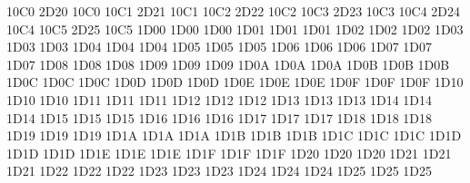 \setcclcuc 10C0 2D20 10C0 %
\setcclcuc 10C1 2D21 10C1 %
\setcclcuc 10C2 2D22 10C2 %
\setcclcuc 10C3 2D23 10C3 %
\setcclcuc 10C4 2D24 10C4 %
\setcclcuc 10C5 2D25 10C5 %
\setcclcuc 1D00 1D00 1D00 %
\setcclcuc 1D01 1D01 1D01 %
\setcclcuc 1D02 1D02 1D02 %
\setcclcuc 1D03 1D03 1D03 %
\setcclcuc 1D04 1D04 1D04 %
\setcclcuc 1D05 1D05 1D05 %
\setcclcuc 1D06 1D06 1D06 %
\setcclcuc 1D07 1D07 1D07 %
\setcclcuc 1D08 1D08 1D08 %
\setcclcuc 1D09 1D09 1D09 %
\setcclcuc 1D0A 1D0A 1D0A %
\setcclcuc 1D0B 1D0B 1D0B %
\setcclcuc 1D0C 1D0C 1D0C %
\setcclcuc 1D0D 1D0D 1D0D %
\setcclcuc 1D0E 1D0E 1D0E %
\setcclcuc 1D0F 1D0F 1D0F %
\setcclcuc 1D10 1D10 1D10 %
\setcclcuc 1D11 1D11 1D11 %
\setcclcuc 1D12 1D12 1D12 %
\setcclcuc 1D13 1D13 1D13 %
\setcclcuc 1D14 1D14 1D14 %
\setcclcuc 1D15 1D15 1D15 %
\setcclcuc 1D16 1D16 1D16 %
\setcclcuc 1D17 1D17 1D17 %
\setcclcuc 1D18 1D18 1D18 %
\setcclcuc 1D19 1D19 1D19 %
\setcclcuc 1D1A 1D1A 1D1A %
\setcclcuc 1D1B 1D1B 1D1B %
\setcclcuc 1D1C 1D1C 1D1C %
\setcclcuc 1D1D 1D1D 1D1D %
\setcclcuc 1D1E 1D1E 1D1E %
\setcclcuc 1D1F 1D1F 1D1F %
\setcclcuc 1D20 1D20 1D20 %
\setcclcuc 1D21 1D21 1D21 %
\setcclcuc 1D22 1D22 1D22 %
\setcclcuc 1D23 1D23 1D23 %
\setcclcuc 1D24 1D24 1D24 %
\setcclcuc 1D25 1D25 1D25 %
